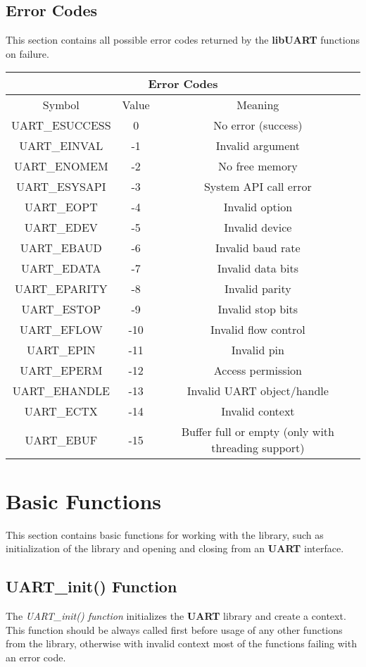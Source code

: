 \documentclass{report}
\begin{document}
\subsection{Error Codes}
This section contains all possible error codes returned by the \textbf{libUART}
functions on failure.
\begin{tabular}{| c | c | c |}
\hline
\multicolumn{3}{|c|}{Error Codes} \\
\hline
Symbol & Value & Meaning \\
\hline
UART\_ESUCCESS & 0 & No error (success) \\
UART\_EINVAL & -1 & Invalid argument \\
UART\_ENOMEM & -2 & No free memory \\
UART\_ESYSAPI & -3 & System API call error \\
UART\_EOPT & -4 & Invalid option \\
UART\_EDEV & -5 & Invalid device \\
UART\_EBAUD & -6 & Invalid baud rate \\
UART\_EDATA & -7 & Invalid data bits \\
UART\_EPARITY & -8 & Invalid parity \\
UART\_ESTOP & -9 & Invalid stop bits \\
UART\_EFLOW & -10 & Invalid flow control \\
UART\_EPIN & -11 & Invalid pin \\
UART\_EPERM & -12 & Access permission \\
UART\_EHANDLE & -13 & Invalid UART object/handle \\
UART\_ECTX & -14 & Invalid context \\
UART\_EBUF & -15 & Buffer full or empty (only with threading support) \\
\hline
\end{tabular}
\section{Basic Functions}
This section contains basic functions for working with the library, such
as initialization of the library and opening and closing from an \textbf{UART}
interface.
\subsection{UART\_init() Function}
The \textit{UART\_init() function} initializes the \textbf{UART} library and create a
context. This function should be always called first before usage of any other functions
from the library, otherwise with invalid context most of the functions failing with an
error code.
\end{document}
